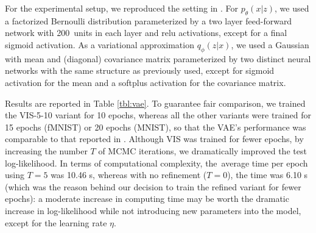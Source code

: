 For the experimental setup, we reproduced the setting in \parencite{pmlr-v89-titsias19a}. For $p_{\theta}(x | z)$, we used a factorized Bernoulli distribution parameterized by a two layer feed-forward network with 200~units in each layer and relu activations, except for a final sigmoid activation. As a variational approximation $q_{\phi}(z | x)$, we used a Gaussian with mean and (diagonal) covariance matrix parameterized by
two distinct neural networks with the same structure as previously used, except for sigmoid activation for the mean and a softplus activation for the covariance matrix.




Results are reported in Table \ref{tbl:vae}. To guarantee 
 fair comparison, we trained the VIS-5-10 variant for 10 epochs, whereas all the other variants were trained for 15 epochs (fMNIST) or 20 epochs (MNIST), so that the VAE's performance was comparable to that reported in \parencite{pmlr-v89-titsias19a}. Although VIS was trained for fewer epochs, by increasing the number $T$ of MCMC iterations, we dramatically improved the test log-likelihood. In terms of computational complexity, the~average time per epoch using $T=5$ was 10.46 s, whereas with no refinement ($T=0$), the time was 6.10 s (which was the reason behind our decision to train the refined variant for fewer epochs): a moderate increase in computing time may be worth the dramatic increase in log-likelihood while not introducing new parameters into the model, except for the learning rate $\eta$.
 
